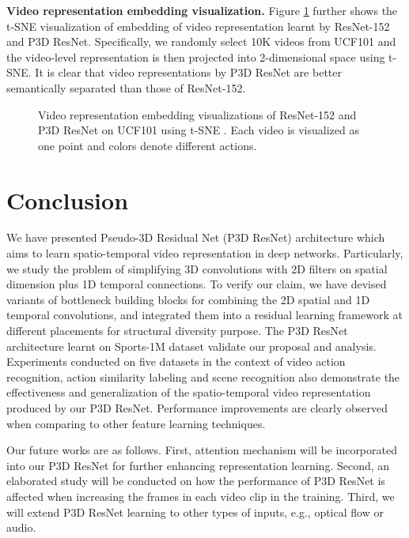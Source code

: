 \documentclass[10pt,twocolumn,letterpaper]{article}
\begin{document}
\textbf{Video representation embedding visualization.} Figure \ref{fig:fig8} further shows the t-SNE \cite{maaten:JMLR08} visualization of embedding of video representation learnt by ResNet-152 and P3D ResNet. Specifically, we randomly select 10K videos from UCF101 and the video-level representation is then projected into 2-dimensional space using t-SNE. It is clear that video representations by P3D ResNet are better semantically separated than those of ResNet-152.



\begin{figure}[!tb]
   \centering
   \caption{\small Video representation embedding visualizations of ResNet-152 and P3D ResNet on UCF101 using t-SNE \cite{maaten:JMLR08}. Each video is visualized as one point and colors denote different actions.}
   \label{fig:fig8}
   \vspace{-0.22in}
\end{figure}



\section{Conclusion}
We have presented Pseudo-3D Residual Net (P3D ResNet) architecture which aims to learn spatio-temporal video representation in deep networks. Particularly, we study the problem of simplifying 3D convolutions with 2D filters on spatial dimension plus 1D temporal connections. To verify our claim, we have devised variants of bottleneck building blocks for combining the 2D spatial and 1D temporal convolutions, and integrated them into a residual learning framework at different placements for structural diversity purpose. The P3D ResNet architecture learnt on Sports-1M dataset validate our proposal and analysis. Experiments conducted on five datasets in the context of video action recognition, action similarity labeling and scene recognition also demonstrate the effectiveness and generalization of the spatio-temporal video representation produced by our P3D ResNet. Performance improvements are clearly observed when comparing to other feature learning techniques.


Our future works are as follows. First, attention mechanism will be incorporated into our P3D ResNet for further enhancing representation learning. Second, an elaborated study will be conducted on how the performance of P3D ResNet is affected when increasing the frames in each video clip in the training. Third, we will extend P3D ResNet learning to other types of inputs, e.g., optical flow or audio.


{\small


}
\end{document}
